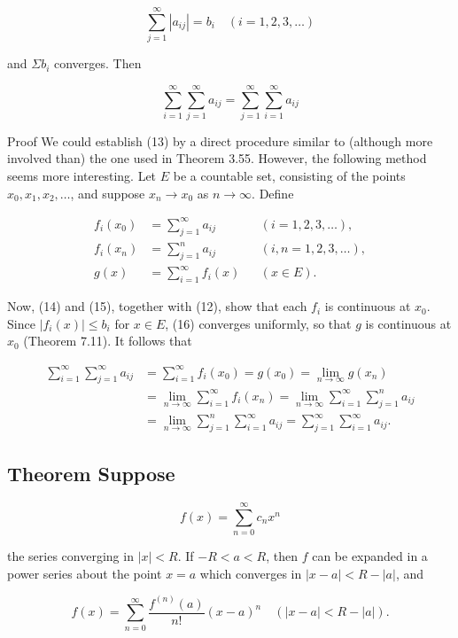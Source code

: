 \documentclass[10pt]{article}
\begin{document}
$$
\sum_{j=1}^{\infty}\left|a_{i j}\right|=b_{i} \quad(i=1,2,3, \ldots)
$$

and $\Sigma b_{i}$ converges. Then

$$
\sum_{i=1}^{\infty} \sum_{j=1}^{\infty} a_{i j}=\sum_{j=1}^{\infty} \sum_{i=1}^{\infty} a_{i j}
$$

Proof We could establish (13) by a direct procedure similar to (although more involved than) the one used in Theorem 3.55. However, the following method seems more interesting. Let $E$ be a countable set, consisting of the points $x_{0}, x_{1}, x_{2}, \ldots$, and suppose $x_{n} \rightarrow x_{0}$ as $n \rightarrow \infty$. Define

$$
\begin{aligned}
f_{i}\left(x_{0}\right) & =\sum_{j=1}^{\infty} a_{i j} & & (i=1,2,3, \ldots), \\
f_{i}\left(x_{n}\right) & =\sum_{j=1}^{n} a_{i j} & & (i, n=1,2,3, \ldots), \\
g(x) & =\sum_{i=1}^{\infty} f_{i}(x) & & (x \in E) .
\end{aligned}
$$

Now, (14) and (15), together with (12), show that each $f_{i}$ is continuous at $x_{0}$. Since $\left|f_{i}(x)\right| \leq b_{i}$ for $x \in E$, (16) converges uniformly, so that $g$ is continuous at $x_{0}$ (Theorem 7.11). It follows that

$$
\begin{aligned}
\sum_{i=1}^{\infty} \sum_{j=1}^{\infty} a_{i j} & =\sum_{i=1}^{\infty} f_{i}\left(x_{0}\right)=g\left(x_{0}\right)=\lim _{n \rightarrow \infty} g\left(x_{n}\right) \\
& =\lim _{n \rightarrow \infty} \sum_{i=1}^{\infty} f_{i}\left(x_{n}\right)=\lim _{n \rightarrow \infty} \sum_{i=1}^{\infty} \sum_{j=1}^{n} a_{i j} \\
& =\lim _{n \rightarrow \infty} \sum_{j=1}^{n} \sum_{i=1}^{\infty} a_{i j}=\sum_{j=1}^{\infty} \sum_{i=1}^{\infty} a_{i j} .
\end{aligned}
$$

\subsection{Theorem Suppose}
$$
f(x)=\sum_{n=0}^{\infty} c_{n} x^{n}
$$

the series converging in $|x|<R$. If $-R<a<R$, then $f$ can be expanded in a power series about the point $x=a$ which converges in $|x-a|<R-|a|$, and

$$
f(x)=\sum_{n=0}^{\infty} \frac{f^{(n)}(a)}{n !}(x-a)^{n} \quad(|x-a|<R-|a|) .
$$
\end{document}
